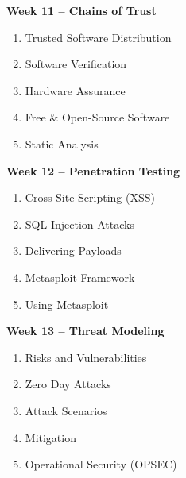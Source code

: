 \documentclass[11pt, a4paper]{article}
\begin{document}
\vspace*{.1in}
\noindent\textbf{Week 11 -- Chains of Trust}
\begin{enumerate}
\item Trusted Software Distribution
\item Software Verification
\item Hardware Assurance
\item Free \& Open-Source Software
\item Static Analysis
\end{enumerate}

\vspace*{.1in}
\noindent\textbf{Week 12 -- Penetration Testing}
\begin{enumerate}
\item Cross-Site Scripting (XSS)
\item SQL Injection Attacks
\item Delivering Payloads
\item Metasploit Framework
\item Using Metasploit %
\end{enumerate}

\vspace*{.1in}
\noindent\textbf{Week 13 -- Threat Modeling}
\begin{enumerate}
\item Risks and Vulnerabilities
\item Zero Day Attacks
\item Attack Scenarios
\item Mitigation
\item Operational Security (OPSEC)
\end{enumerate}

\end{document}
